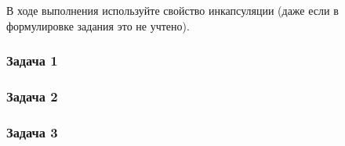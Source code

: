В ходе выполнения используйте свойство инкапсуляции (даже если в формулировке 
задания это не учтено).

\subsubsection{Задача 1}

    

\subsubsection{Задача 2}

    

\subsubsection{Задача 3}

\begin{enumerate}
    
\end{enumerate}